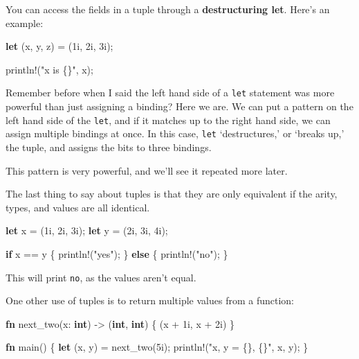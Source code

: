\documentclass[]{article}
\newenvironment{Shaded}{}{}
\newcommand{\KeywordTok}[1]{\textcolor[rgb]{0.00,0.44,0.13}{\textbf{{#1}}}}
\newcommand{\DecValTok}[1]{\textcolor[rgb]{0.25,0.63,0.44}{{#1}}}
\newcommand{\StringTok}[1]{\textcolor[rgb]{0.25,0.44,0.63}{{#1}}}
\newcommand{\OtherTok}[1]{\textcolor[rgb]{0.00,0.44,0.13}{{#1}}}
\newcommand{\NormalTok}[1]{{#1}}
\begin{document}
You can access the fields in a tuple through a \textbf{destructuring
let}. Here's an example:

\begin{Shaded}
\begin{Highlighting}[]
\KeywordTok{let} \NormalTok{(x, y, z) = (}\DecValTok{1i}\NormalTok{, }\DecValTok{2i}\NormalTok{, }\DecValTok{3i}\NormalTok{);}

\OtherTok{println!}\NormalTok{(}\StringTok{"x is \{\}"}\NormalTok{, x);}
\end{Highlighting}
\end{Shaded}

Remember before when I said the left hand side of a \texttt{let}
statement was more powerful than just assigning a binding? Here we are.
We can put a pattern on the left hand side of the \texttt{let}, and if
it matches up to the right hand side, we can assign multiple bindings at
once. In this case, \texttt{let} `destructures,' or `breaks up,' the
tuple, and assigns the bits to three bindings.

This pattern is very powerful, and we'll see it repeated more later.

The last thing to say about tuples is that they are only equivalent if
the arity, types, and values are all identical.

\begin{Shaded}
\begin{Highlighting}[]
\KeywordTok{let} \NormalTok{x = (}\DecValTok{1i}\NormalTok{, }\DecValTok{2i}\NormalTok{, }\DecValTok{3i}\NormalTok{);}
\KeywordTok{let} \NormalTok{y = (}\DecValTok{2i}\NormalTok{, }\DecValTok{3i}\NormalTok{, }\DecValTok{4i}\NormalTok{);}

\KeywordTok{if} \NormalTok{x == y \{}
    \OtherTok{println!}\NormalTok{(}\StringTok{"yes"}\NormalTok{);}
\NormalTok{\} }\KeywordTok{else} \NormalTok{\{}
    \OtherTok{println!}\NormalTok{(}\StringTok{"no"}\NormalTok{);}
\NormalTok{\}}
\end{Highlighting}
\end{Shaded}

This will print \texttt{no}, as the values aren't equal.

One other use of tuples is to return multiple values from a function:

\begin{Shaded}
\begin{Highlighting}[]
\KeywordTok{fn} \NormalTok{next_two(x: }\KeywordTok{int}\NormalTok{) -> (}\KeywordTok{int}\NormalTok{, }\KeywordTok{int}\NormalTok{) \{ (x + }\DecValTok{1i}\NormalTok{, x + }\DecValTok{2i}\NormalTok{) \}}

\KeywordTok{fn} \NormalTok{main() \{}
    \KeywordTok{let} \NormalTok{(x, y) = next_two(}\DecValTok{5i}\NormalTok{);}
    \OtherTok{println!}\NormalTok{(}\StringTok{"x, y = \{\}, \{\}"}\NormalTok{, x, y);}
\NormalTok{\}}
\end{Highlighting}
\end{Shaded}
\end{document}
